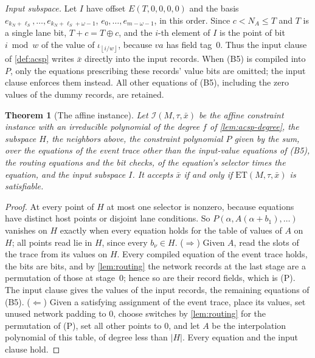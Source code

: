 \documentclass[11pt,letterpaper]{article}
\newtheorem{theorem}{Theorem}[section]
\theoremstyle{definition}
\theoremstyle{remark}
\newcommand{\floor}[1]{\left\lfloor #1\right\rfloor}
\newcommand{\abs}[1]{\left|#1\right|}
\begin{document}
\emph{Input subspace.} Let \(I\) have offset \(E(T,0,0,0,0)\) and the basis
\(e_{k_N+\ell_S},\ldots,e_{k_N+\ell_S+\omega-1}\),
\(e_0,\ldots,e_{m-\omega-1}\), in this order. Since \(c<N_A\le T\) and \(T\) is a single lane bit,
\(T+c=T\oplus c\), and the \(i\)-th element of \(I\) is the point of
bit \(i\bmod w\) of the value of \(\iota_{\floor{i/w}}\), because
\(\mathit{va}\) has field tag~\(0\). Thus the input clause of
\cref{def:acsp} writes \(\bar x\) directly into the input records. When
(B5) is compiled into \(P\), only the equations prescribing these
records' value bits are omitted; the input clause enforces them
instead. All other equations of (B5), including the zero values of the
dummy records, are retained.

\begin{theorem}[The affine instance]\label{thm:embedding}
Let \(\mathcal I(M,\tau,\bar x)\) be the affine constraint instance with
an irreducible polynomial of the degree \(f\) of \cref{lem:acsp-degree},
the subspace \(H\), the neighbors
above, the constraint polynomial \(P\) given by the sum, over the
equations of the event trace other than the input-value equations of
(B5), the routing equations and the bit checks, of the equation's
selector times the equation, and the input subspace
\(I\). It accepts \(\bar x\) if and only if
\(\mathrm{ET}(M,\tau,\bar x)\) is satisfiable.
\end{theorem}
\begin{proof}
At every point of \(H\) at most one selector is nonzero, because
equations have distinct host points or disjoint lane conditions. So
\(P(\alpha,A(\alpha+b_1),\ldots)\) vanishes on \(H\) exactly when every
equation holds for the table of values of \(A\) on \(H\); all points read
lie in \(H\), since every \(b_\nu\in H\). (\(\Rightarrow\)) Given \(A\),
read the slots of the trace from its values on \(H\). Every compiled
equation of the event trace holds, the bits are bits, and by \cref{lem:routing}
the network records at the last stage are a permutation of those at
stage~\(0\); hence so are their record fields, which is (P). The input
clause gives the values of the input records, the remaining equations
of (B5). (\(\Leftarrow\)) Given a
satisfying assignment of the event trace, place its values, set unused
network padding to \(0\), choose switches by \cref{lem:routing} for the
permutation of (P), set all other points to \(0\), and let \(A\) be the
interpolation polynomial of this table, of degree less than
\(\abs H\). Every equation and the input clause hold.
\end{proof}
\end{document}
